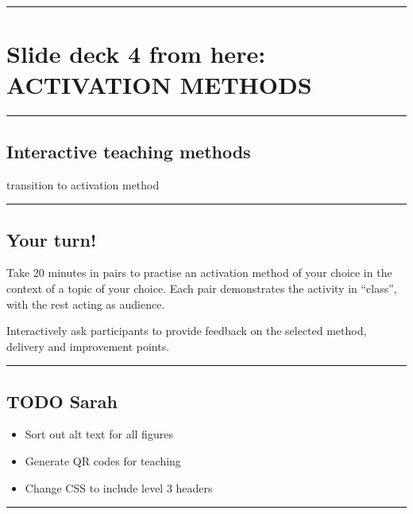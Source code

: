 \documentclass[
  letterpaper,
  DIV=11,
  numbers=noendperiod]{scrartcl}
\providecommand{\tightlist}{%
  \setlength{\itemsep}{0pt}\setlength{\parskip}{0pt}}
\begin{document}
\begin{center}\rule{0.5\linewidth}{0.5pt}\end{center}

\section{Slide deck 4 from here: ACTIVATION
METHODS}\label{slide-deck-4-from-here-activation-methods}

\begin{center}\rule{0.5\linewidth}{0.5pt}\end{center}

\subsection{Interactive teaching
methods}\label{interactive-teaching-methods}

transition to activation method

\begin{center}\rule{0.5\linewidth}{0.5pt}\end{center}

\subsection{Your turn!}\label{your-turn}

Take 20 minutes in pairs to practise an activation method of your choice
in the context of a topic of your choice. Each pair demonstrates the
activity in ``class'', with the rest acting as audience.

Interactively ask participants to provide feedback on the selected
method, delivery and improvement points.

\begin{center}\rule{0.5\linewidth}{0.5pt}\end{center}

\subsection{TODO Sarah}\label{todo-sarah}

\begin{itemize}
\tightlist
\item[$\square$]
  Sort out alt text for all figures
\item[$\square$]
  Generate QR codes for teaching
\item[$\square$]
  Change CSS to include level 3 headers
\end{itemize}

\begin{center}\rule{0.5\linewidth}{0.5pt}\end{center}
\end{document}
